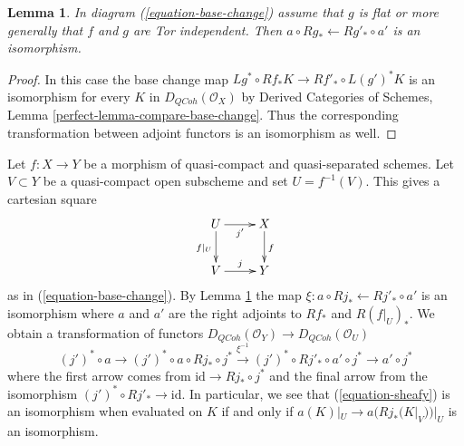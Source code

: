 \documentclass{stacks-project}
\theoremstyle{plain}
\newtheorem{lemma}[subsection]{Lemma}
\theoremstyle{definition}
\theoremstyle{remark}
\numberwithin{equation}{subsection}
\def\QCoh{\mathit{QCoh}}
\begin{document}
\begin{lemma}
\label{lemma-flat-precompose-pus}
In diagram (\ref{equation-base-change}) assume that $g$ is flat or
more generally that $f$ and $g$ are Tor independent. Then
$a \circ Rg_* \leftarrow Rg'_* \circ a'$ is an isomorphism.
\end{lemma}

\begin{proof}
In this case the base change map
$Lg^* \circ Rf_* K \longrightarrow Rf'_* \circ L(g')^*K$
is an isomorphism for every $K$ in $D_\QCoh(\mathcal{O}_X)$ by
Derived Categories of Schemes, Lemma \ref{perfect-lemma-compare-base-change}.
Thus the corresponding transformation between adjoint functors
is an isomorphism as well.
\end{proof}

\noindent
Let $f : X \to Y$ be a morphism of quasi-compact and quasi-separated
schemes. Let $V \subset Y$ be a quasi-compact open subscheme and set
$U = f^{-1}(V)$. This gives a cartesian square
$$
\xymatrix{
U \ar[r]_{j'} \ar[d]_{f|_U} & X \ar[d]^f \\
V \ar[r]^j & Y
}
$$
as in (\ref{equation-base-change}). By Lemma \ref{lemma-flat-precompose-pus}
the map $\xi : a \circ Rj_* \leftarrow Rj'_* \circ a'$ is an isomorphism
where $a$ and $a'$ are the right adjoints to
$Rf_*$ and $R(f|_U)_*$. We obtain a transformation
of functors $D_\QCoh(\mathcal{O}_Y) \to D_\QCoh(\mathcal{O}_U)$
\begin{equation}
\label{equation-sheafy}
(j')^* \circ a \to
(j')^* \circ a \circ Rj_* \circ j^* \xrightarrow{\xi^{-1}}
(j')^* \circ Rj'_* \circ a' \circ j^* \to a' \circ j^*
\end{equation}
where the first arrow comes from $\text{id} \to Rj_* \circ j^*$
and the final arrow from the isomorphism $(j')^* \circ Rj'_* \to \text{id}$.
In particular, we see that (\ref{equation-sheafy}) is an isomorphism
when evaluated on $K$ if and only if $a(K)|_U \to a(Rj_*(K|_V))|_U$
is an isomorphism.
\end{document}
